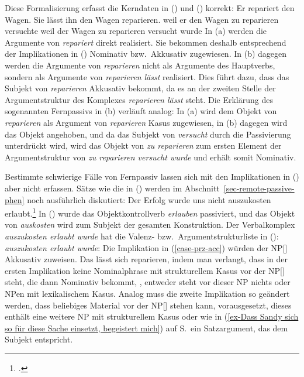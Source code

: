     \mbox{}\hfill{}
\zl
Diese Formalisierung erfasst die Kerndaten in () und () korrekt:
\eal
\ex Er repariert den Wagen.
\ex Sie lässt ihn den Wagen reparieren.
\zl
\eal
\ex weil er den Wagen zu reparieren versuchte
\ex weil der Wagen zu reparieren versucht wurde
\zl
In (a) werden die Argumente von \emph{repariert} direkt realisiert.
Sie bekommen deshalb entsprechend der Implikationen in () Nominativ
bzw.\ Akkusativ zugewiesen. In (b) dagegen werden die Argumente von
\emph{reparieren} nicht als Argumente des Hauptverbs, sondern als Argumente
von \emph{reparieren lässt} realisiert. Dies führt dazu, dass das Subjekt
von \emph{reparieren} Akkusativ bekommt, da es an der zweiten Stelle
der Argumentstruktur des Komplexes \emph{reparieren lässt} steht.
Die Erklärung des sogenannten Fernpassivs in (b) verläuft analog:
In (a) wird dem Objekt von \emph{reparieren} als Argument von \emph{reparieren} Kasus
zugewiesen, in (b) dagegen wird das Objekt angehoben, und da
das Subjekt von \emph{versucht} durch die Passivierung unterdrückt wird,
wird das Objekt von \emph{zu reparieren} zum ersten Element der
Argumentstruktur von \emph{zu reparieren versucht wurde} und erhält somit
Nominativ.

Bestimmte schwierige Fälle von Fernpassiv lassen sich mit den Implikationen
in () aber nicht erfassen. Sätze wie die
in () werden im Abschnitt~\ref{sec-remote-passive-phen}
noch ausführlich diskutiert:
\ea\label{erfolg-auszukosten-erlaubt-kasus}
Der Erfolg        wurde uns      nicht auszukosten erlaubt.\footnote{
        .%
}
\z
In () wurde das Objektkontrollverb \emph{erlauben} passiviert,
und das Objekt von \emph{auskosten} wird zum Subjekt der gesamten Konstruktion.
Der Verbalkomplex \emph{auszukosten erlaubt wurde} hat die Valenz- bzw.\
Argumentstrukturliste in ():
\ea
\emph{auszukosten erlaubt wurde}:   
\z
Die Implikation in (\ref{case-prz-acc}) würden der NP[\str] Akkusativ zuweisen.
Das lässt sich reparieren, indem man verlangt, dass in der ersten Implikation
keine Nominalphrase mit strukturellem Kasus vor der NP[\str] steht, die dann
Nominativ bekommt, \dash, entweder steht vor dieser NP nichts oder NPen mit lexikalischem
Kasus. Analog muss die zweite Implikation 
so geändert werden, dass beliebiges Material vor der NP[\str] stehen kann,
vorausgesetzt, dieses enthält eine weitere NP mit strukturellem Kasus oder wie in (\ref{ex-Dass
  Sandy sich so für diese Sache einsetzt, begeistert mich}) auf S.\,\pageref{ex-Dass Sandy sich so
  für diese Sache einsetzt, begeistert mich} ein Satzargument, das dem Subjekt entspricht.

